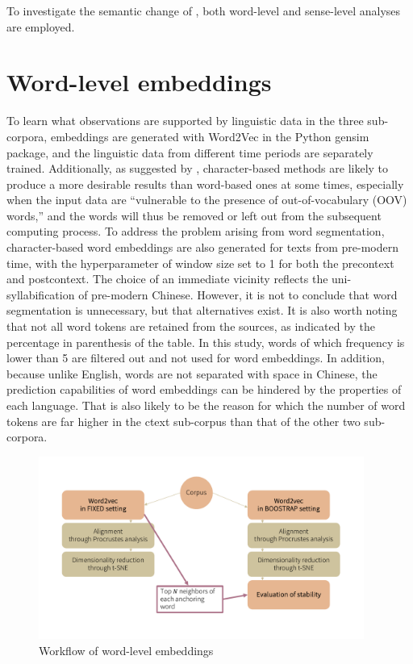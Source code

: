 To investigate the semantic change of \jia\rspace, both word-level and sense-level analyses are employed.

\section{Word-level embeddings}
To learn what observations are supported by linguistic data in the three sub-corpora, embeddings are generated with Word2Vec in the Python gensim package, and the linguistic data from different time periods are separately trained. Additionally, as suggested by \textcite{li2019word}, character-based methods are likely to produce a more desirable results than word-based ones at some times, especially when the input data are ``vulnerable to the presence of out-of-vocabulary (OOV) words,'' and the words will thus be removed or left out from the subsequent computing process. To address the problem arising from word segmentation, character-based word embeddings are also generated for texts from pre-modern time, with the hyperparameter of window size set to 1 for both the precontext and postcontext. The choice of an immediate vicinity reflects the uni-syllabification of pre-modern Chinese. However, it is not to conclude that word segmentation is unnecessary, but that alternatives exist.  It is also worth noting that not all word tokens are retained from the sources, as indicated by the percentage in parenthesis of the table. In this study, words of which frequency is lower than 5 are filtered out and not used for word embeddings. In addition, because unlike English, words are not separated with space in Chinese, the prediction capabilities of word embeddings can be hindered by the properties of each language. That is also likely to be the reason for which the number of word tokens are far higher in the \gls{ctext} sub-corpus than that of the other two sub-corpora.

\begin{figure}[H]
  \centering
  \includegraphics[height=0.4\textheight,width=0.95\textwidth,keepaspectratio]{figures_new/from_slides/workflow_word_level.pdf}
  \caption{Workflow of word-level embeddings}
  \label{fig:workflow_word_level}
\end{figure}

